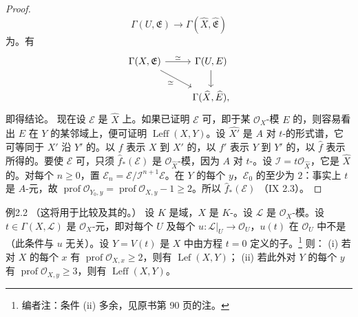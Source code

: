 \begin{proof}
\[\Gamma(U,\mathfrak E)\longrightarrow\Gamma(\widehat X,\widehat{\mathfrak E})\tag{2}\]
为。有
\[\begin{tikzcd}\Gamma(X,\mathfrak E)\arrow[r,"\simeq"]\arrow[dr,"\simeq"']&\Gamma(U,E)\arrow[d]\\&\Gamma(\widehat X,\widehat E),\end{tikzcd}\]
即得结论。
现在设 $\mathcal E$ 是 $\widehat X$ 上。如果已证明 $\mathcal E$ 可，即于某 $\mathcal O_X$-模 $E$ 的，则容易看出 $E$ 在 $Y$ 的某邻域上，便可证明 $\operatorname{Leff}(X,Y)$。设 $\widehat{X'}$ 是 $A$ 对 $t$-的形式谱，它可等同于 $X'$ 沿 $Y'$ 的。以 $f$ 表示 $X$ 到 $X'$ 的，以 $f'$ 表示 $Y$ 到 $Y'$ 的，以 $\widehat f$ 表示所得的。要使 $\mathcal E$ 可，只须 $\widehat f_*(\mathcal E)$ 是 $\mathcal O_{\widehat X}$-模，因为 $A$ 对 $t$-。设 $\mathcal I=t\mathcal O_{\widehat X}$，它是 $\widehat X$ 的。对每个 $n\geq0$，置 $\mathcal E_n=\mathcal E/\mathcal I^{n+1}\mathcal E$。在 $Y$ 的每个 $y$，$\mathcal E_0$ 的至少为 $2$：事实上 $t$ 是 $A$-元，故 $\operatorname{prof}\mathcal O_{Y_0,y}=\operatorname{prof}\mathcal O_{X,y}-1\geq2$。所以 $\widehat f_*(\mathcal E)$ （IX 2.3）。
\end{proof}
\begin{SGAresult}{例}{2.2}
（这将用于比较及其的。）
设 $K$ 是域，$X$ 是 $K$-。设 $\mathcal L$ 是 $\mathcal O_X$-模。设 $t\in\Gamma(X,\mathcal L)$ 是 $\mathcal O_X$-元，即对每个 $U$ 及每个 $u:\mathcal L|_U\to\mathcal O_U$，$u(t)$ 在 $\mathcal O_U$ 中不是（此条件与 $u$ 无关）。设 $Y=V(t)$ 是 $X$ 中由方程 $t=0$ 定义的子。\footnote{编者注：条件 (ii) 多余，见原书第 90 页的注。} 则：
(i) 若对 $X$ 的每个 $x$ 有 $\operatorname{prof}\mathcal O_{X,x}\geq2$，则有 $\operatorname{Lef}(X,Y)$；
(ii) 若此外对 $Y$ 的每个 $y$ 有 $\operatorname{prof}\mathcal O_{X,y}\geq3$，则有 $\operatorname{Leff}(X,Y)$。
\end{SGAresult}
